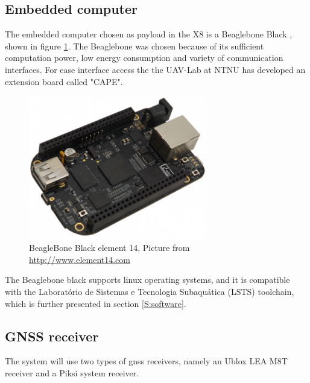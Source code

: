 \subsection{Embedded computer}
The embedded computer chosen as payload in the X8 is a Beaglebone Black \citep{BeagleBoneBlack}, shown in figure \ref{figure:BeagleBone}. The Beaglebone was chosen because of its sufficient computation power, low energy consumption and variety of communication interfaces. For ease interface access the  the UAV-Lab at NTNU has developed an extension board called "CAPE"\citep{KlausenX8}.
\begin{figure}[H]
	\centering
		\includegraphics[width=0.7\textwidth]{figs/BeagleBoneBlackE14.png}
		\caption{BeagleBone Black element 14, Picture from \url{http://www.element14.com}}
		\label{figure:BeagleBone}
\end{figure}
The Beaglebone black supports linux operating systems, and it is compatible with the Laboratório de Sistemas e Tecnologia Subaquática (LSTS) toolchain, which is further presented in section \ref{S:software}.
\subsection{GNSS receiver}
The system will use two types of \gls{gnss} receivers, namely an Ublox LEA M8T receiver and a Piksi system receiver. 


